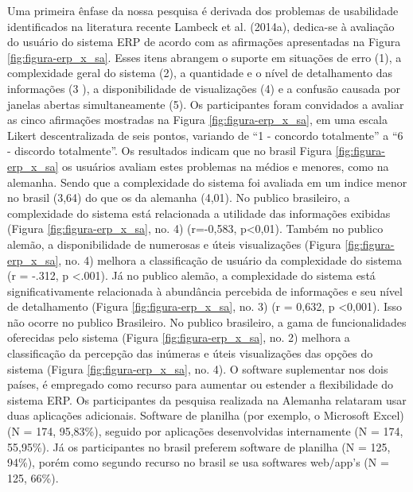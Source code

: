 Uma primeira ênfase da nossa pesquisa é derivada dos problemas de usabilidade identificados na literatura recente Lambeck et al. (2014a), dedica-se à avaliação do usuário do sistema ERP de acordo com as afirmações apresentadas na Figura \ref{fig:figura-erp_x_sa}. Esses itens abrangem o suporte em situações de erro (1), a complexidade geral do sistema (2), a quantidade e o nível de detalhamento das informações (3 ), a disponibilidade de visualizações (4) e a confusão causada por janelas abertas simultaneamente (5). Os participantes foram convidados a avaliar as cinco afirmações mostradas na Figura \ref{fig:figura-erp_x_sa}, em uma escala Likert descentralizada de seis pontos, variando de “1 - concordo totalmente” a “6 - discordo totalmente”.\newline
\indent Os resultados indicam que no brasil Figura \ref{fig:figura-erp_x_sa} os  usuários avaliam estes problemas na médios e menores, como na alemanha. Sendo que a complexidade do sistema foi avaliada em um indice menor no brasil (3,64) do que os da alemanha (4,01).  No publico brasileiro, a complexidade do sistema está relacionada a utilidade das informações exibidas (Figura \ref{fig:figura-erp_x_sa}, no. 4) (r=-0,583, p<0,01). Também no publico alemão, a disponibilidade de numerosas e úteis visualizações (Figura \ref{fig:figura-erp_x_sa}, no. 4) melhora a classificação de usuário da complexidade do sistema (r = -.312, p <.001). Já no publico alemão, a complexidade do sistema está significativamente relacionada à abundância percebida de informações e seu nível de detalhamento (Figura \ref{fig:figura-erp_x_sa}, no. 3) (r = 0,632, p <0,001). Isso não ocorre no publico Brasileiro.\newline
\indent No publico brasileiro, a gama de funcionalidades oferecidas pelo sistema (Figura \ref{fig:figura-erp_x_sa}, no. 2) melhora a classificação da percepção das inúmeras e úteis visualizações das opções do sistema (Figura \ref{fig:figura-erp_x_sa}, no. 4). O software suplementar nos dois países, é empregado como recurso para aumentar ou estender a flexibilidade do sistema ERP. \newline
\indent Os participantes da pesquisa realizada na Alemanha relataram usar duas aplicações adicionais. Software de planilha (por exemplo, o Microsoft Excel) (N = 174, 95,83\%), seguido por aplicações desenvolvidas internamente (N = 174, 55,95\%). Já os participantes no brasil preferem software de planilha (N = 125, 94\%), porém como segundo recurso no brasil se usa softwares web/app's  (N = 125, 66\%).\newline
